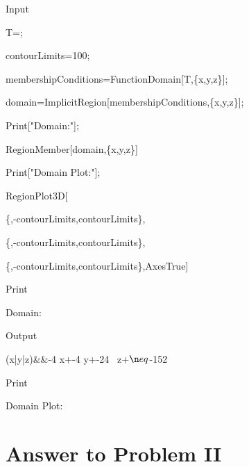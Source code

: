 \documentclass[11pt,a4paper]{article}
\begin{document}
\begin{mmaCell}[moredefined={T, contourLimits, membershipConditions, \
domain}]{Input}

  T=;

  

  contourLimits=100;

  membershipConditions=FunctionDomain[T,\{x,y,z\}];

  domain=ImplicitRegion[membershipConditions,\{x,y,z\}];

  Print["Domain:"];

  RegionMember[domain,\{x,y,z\}]

  Print["Domain Plot:"];

  RegionPlot3D[


  \{,-contourLimits,contourLimits\},

  \{,-contourLimits,contourLimits\},

  \{,-contourLimits,contourLimits\},Axes\pmb{\to}True]

  

\end{mmaCell}



\begin{mmaCell}{Print}

  Domain:

\end{mmaCell}



\begin{mmaCell}[addtoindex=5]{Output}

  (x|y|z)\in{}&&-4 x+-4 y+-24 \
z+\(\n eq\)-152

\end{mmaCell}



\begin{mmaCell}{Print}

  Domain Plot:

\end{mmaCell}


\clearpage

\section{Answer to Problem II}\label{sec:P02}
\end{document}
